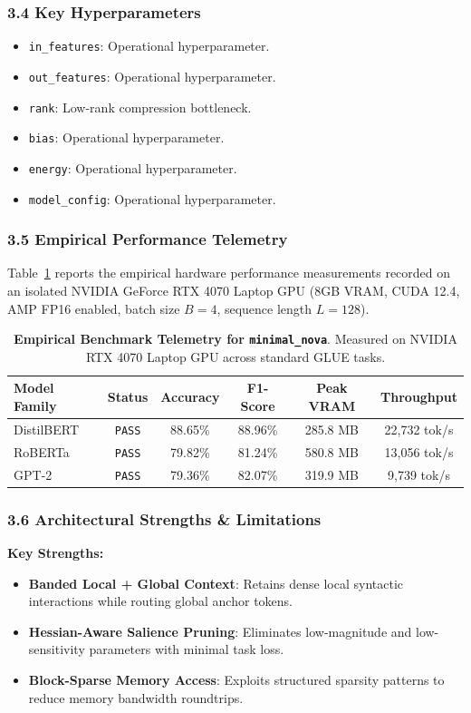 \subsubsection*{3.4 Key Hyperparameters}
\begin{itemize}
    \item \texttt{in\_features}: Operational hyperparameter.
    \item \texttt{out\_features}: Operational hyperparameter.
    \item \texttt{rank}: Low-rank compression bottleneck.
    \item \texttt{bias}: Operational hyperparameter.
    \item \texttt{energy}: Operational hyperparameter.
    \item \texttt{model\_config}: Operational hyperparameter.
\end{itemize}

\subsubsection*{3.5 Empirical Performance Telemetry}
Table~\ref{tab:telemetry_minimal_nova} reports the empirical hardware performance measurements recorded on an isolated NVIDIA GeForce RTX 4070 Laptop GPU (8GB VRAM, CUDA 12.4, AMP FP16 enabled, batch size $B=4$, sequence length $L=128$).

\begin{table}[h]
\centering
\small
\caption{\textbf{Empirical Benchmark Telemetry for \texttt{minimal\_nova}}. Measured on NVIDIA RTX 4070 Laptop GPU across standard GLUE tasks.}
\label{tab:telemetry_minimal_nova}
\begin{tabular*}{\columnwidth}{@{\extracolsep{\fill}}lccccc}
\toprule
\textbf{Model Family} & \textbf{Status} & \textbf{Accuracy} & \textbf{F1-Score} & \textbf{Peak VRAM} & \textbf{Throughput} \\
\midrule
DistilBERT & \texttt{PASS} & 88.65\% & 88.96\% & 285.8 MB & 22,732 tok/s \\
RoBERTa & \texttt{PASS} & 79.82\% & 81.24\% & 580.8 MB & 13,056 tok/s \\
GPT-2 & \texttt{PASS} & 79.36\% & 82.07\% & 319.9 MB & 9,739 tok/s \\
\bottomrule
\end{tabular*}
\end{table}

\subsubsection*{3.6 Architectural Strengths \& Limitations}
\textbf{Key Strengths:}
\begin{itemize}
    \item \textbf{Banded Local + Global Context}: Retains dense local syntactic interactions while routing global anchor tokens.
    \item \textbf{Hessian-Aware Salience Pruning}: Eliminates low-magnitude and low-sensitivity parameters with minimal task loss.
    \item \textbf{Block-Sparse Memory Access}: Exploits structured sparsity patterns to reduce memory bandwidth roundtrips.
\end{itemize}

